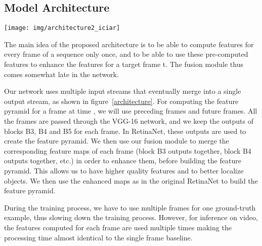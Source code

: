 \documentclass[runningheads]{llncs}
\begin{document}
\subsection{Model Architecture}

\begin{figure*}
\begin{center}
\texttt{[image: img/architecture2\_iciar]}
\end{center}
\vspace{-1em}
   \caption{A representation of our architecture with . Each frame is passed through a pre-trained VGG-16, and the outputs of block 3, block 4 and block 5 are collected for fusion. B1 to B5 are the standard VGG-16~\cite{VGG_Simonyan2014} blocks, and P3 to P7 are the feature pyramid levels. In the dotted frame is an overview of our baseline, a RetinaNet~\cite{lin2018focal} with VGG-16 as a backbone.}
\label{architecture}
\end{figure*}

The main idea of the proposed architecture is to be able to compute features for every frame of a sequence only once, and to be able to use these pre-computed features to enhance the features for a target frame t. The fusion module thus comes somewhat late in the network. 

Our network uses multiple input streams that eventually merge into a single output stream, as shown in figure~\ref{architecture}. For computing the feature pyramid for a frame at time , we will use  preceding frames and  future frames. All the  frames are passed through the VGG-16 network, and we keep the outputs of blocks B3, B4 and B5 for each frame. In RetinaNet, these outputs are used to create the feature pyramid. We then use our fusion module to merge the corresponding feature maps of each frame (block B3 outputs together, block B4 outputs together, etc.) in order to enhance them, before building the feature pyramid. This allows us to have higher quality features and to better localize objects. We then use the enhanced maps as in the original RetinaNet to build the feature pyramid. 

During the training process, we have to use multiple frames for one ground-truth example, thus slowing down the training process. However, for inference on video, the features computed for each frame are used multiple times making the processing time almost identical to the single frame baseline. 
\end{document}
